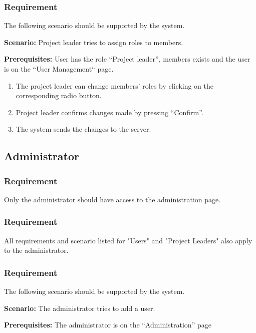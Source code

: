 \documentclass{article}
\begin{document}
\subsubsection{Requirement}
The following scenario should be supported by the system.

\textbf{Scenario:} Project leader tries to assign roles to members.

\textbf{Prerequisites:} User has the role “Project leader”, members exists and the user is on the “User Management“ page.

\begin{enumerate}
    \item The project leader can change members' roles by clicking on the corresponding radio button.
    \item Project leader confirms changes made by pressing “Confirm”.
    \item The system sends the changes to the server.
    
\end{enumerate}


\subsection{Administrator}


\subsubsection{Requirement}
Only the administrator should have access to the administration page.

\subsubsection{Requirement}
All requirements and scenario listed for "Users" and "Project Leaders" also apply to the administrator.

\subsubsection{Requirement}
The following scenario should be supported by the system.

\textbf{Scenario:} The administrator tries to add a user.

\textbf{Prerequisites:} The administrator is on the “Administration” page
\end{document}
